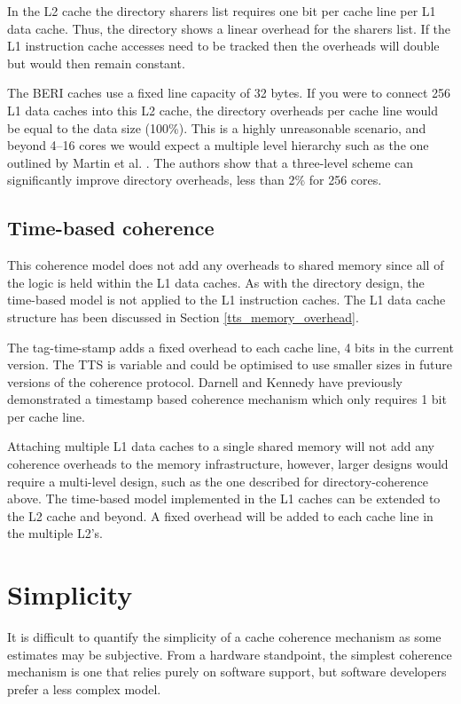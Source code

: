 			In the L2 cache the directory sharers list requires one bit per cache line per L1 data cache. Thus, the directory shows a linear overhead for the sharers list. If the L1 instruction cache accesses need to be tracked then the overheads will double but would then remain constant. 
			
			The BERI caches use a fixed line capacity of 32 bytes. If you were to connect 256 L1 data caches into this L2 cache, the directory overheads per cache line would be equal to the data size (100\%). This is a highly unreasonable scenario, and beyond 4--16 cores we would expect a multiple level hierarchy such as the one outlined by Martin et al. \cite{Martin12}. The authors show that a three-level scheme can significantly improve directory overheads, less than 2\% for 256 cores. 
		
		\subsection{Time-based coherence}
			This coherence model does not add any overheads to shared memory since all of the logic is held within the L1 data caches. As with the directory design, the time-based model is not applied to the L1 instruction caches. The L1 data cache structure has been discussed in Section \ref{tts_memory_overhead}. 
			
			The tag-time-stamp adds a fixed overhead to each cache line, 4 bits in the current version. The TTS is variable and could be optimised to use smaller sizes in future versions of the coherence protocol. Darnell and Kennedy \cite{Darnell93} have previously demonstrated a timestamp based coherence mechanism which only requires 1 bit per cache line.
			
			Attaching multiple L1 data caches to a single shared memory will not add any coherence overheads to the memory infrastructure, however, larger designs would require a multi-level design, such as the one described for directory-coherence above. The time-based model implemented in the L1 caches can be extended to the L2 cache and beyond. A fixed overhead will be added to each cache line in the multiple L2's.

		
	\section{Simplicity}
		It is difficult to quantify the simplicity of a cache coherence mechanism as some estimates may be subjective. From a hardware standpoint, the simplest coherence mechanism is one that relies purely on software support, but software developers prefer a less complex model.
		
